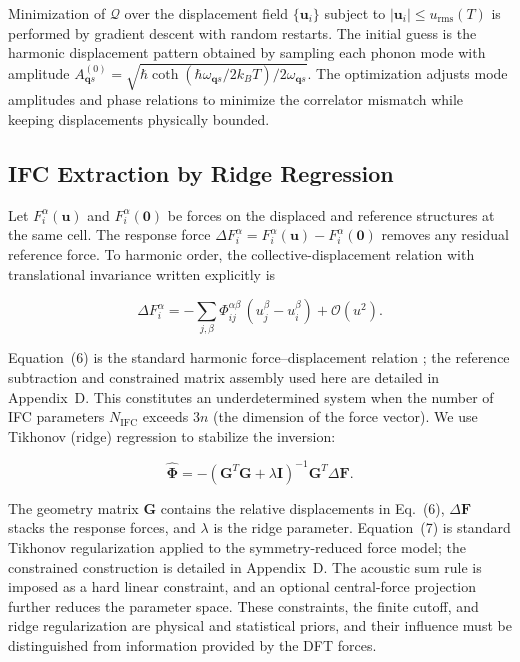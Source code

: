 \documentclass[aps,prb,reprint,amsmath,amssymb,floatfix]{revtex4-2}
\begin{document}
Minimization of \(\mathcal{Q}\) over the displacement field
\(\{\mathbf{u}_i\}\) subject to \(|\mathbf{u}_i| \leq u_\text{rms}(T)\)
is performed by gradient descent with random restarts. The initial guess
is the harmonic displacement pattern obtained by sampling each phonon
mode with amplitude
\(A_{\mathbf{q}s}^{(0)} = \sqrt{\hbar\coth(\hbar\omega_{\mathbf{q}s}/2k_BT)/2\omega_{\mathbf{q}s}}\).
The optimization adjusts mode amplitudes and phase relations to minimize
the correlator mismatch while keeping displacements physically bounded.

\subsection{IFC Extraction by Ridge
Regression}\label{ifc-extraction-by-ridge-regression}

\color{revisionblue}
Let \(F_i^\alpha(\mathbf u)\) and \(F_i^\alpha(\mathbf0)\) be forces on the
displaced and reference structures at the same cell. The response force
\(\Delta F_i^\alpha=F_i^\alpha(\mathbf u)-F_i^\alpha(\mathbf0)\) removes any
residual reference force. To harmonic order, the collective-displacement
relation with translational invariance written explicitly is
\color{black}

\color{revisionblue}
\begin{equation}
\Delta F_i^\alpha = -\sum_{j,\beta}
\Phi_{ij}^{\alpha\beta}\,(u_j^\beta-u_i^\beta)
+\mathcal O(u^2).
\end{equation}
\color{black}

\color{revisionblue}
Equation~(6) is the standard harmonic force--displacement relation
\cite{ref13}; the reference subtraction and constrained matrix assembly used
here are detailed in Appendix~D.
This constitutes an underdetermined system when the number of IFC
parameters \(N_\text{IFC}\) exceeds \(3n\) (the dimension of the force
vector). We use Tikhonov (ridge) regression to stabilize the inversion:
\color{black}

\color{revisionblue}
\begin{equation}
\hat{\boldsymbol{\Phi}} = -\left(\mathbf{G}^T\mathbf{G} + \lambda\mathbf{I}\right)^{-1} \mathbf{G}^T \Delta\mathbf{F}.
\end{equation}
\color{black}

\color{revisionblue}
The geometry matrix \(\mathbf G\) contains the relative displacements in
Eq.~(6), \(\Delta\mathbf F\) stacks the response forces, and \(\lambda\) is the
ridge parameter. Equation~(7) is standard Tikhonov regularization applied to
the symmetry-reduced force model; the constrained construction is detailed in
Appendix~D. The acoustic sum rule is imposed as a hard linear constraint, and
an optional central-force projection further reduces the parameter space.
These constraints, the finite cutoff, and ridge regularization are physical and
statistical priors, and their influence must be distinguished from information
provided by the DFT forces.
\color{black}
\end{document}
